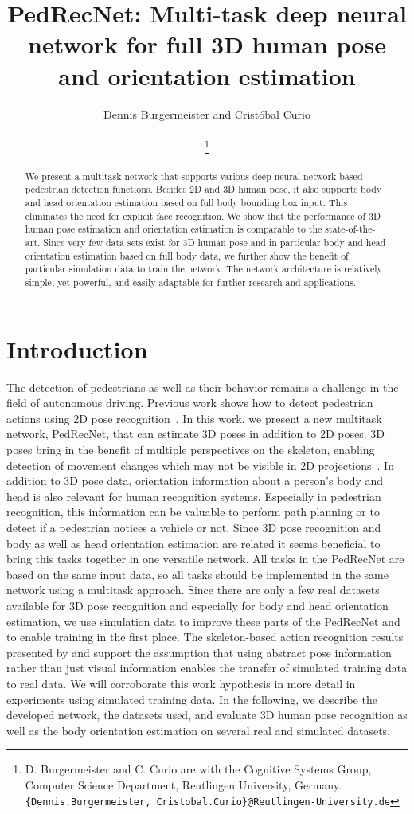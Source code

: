 \documentclass[a4paper, 10pt, conference]{ieeeconf}
\title{\LARGE \bf
PedRecNet: Multi-task deep neural network for full 3D human pose and orientation estimation
}
\author{Dennis Burgermeister and Crist\'obal Curio\\
	\scriptsize \\
\thanks{D. Burgermeister and C. Curio are with the Cognitive Systems Group, Computer Science Department, Reutlingen University, Germany.
{\tt\small \{Dennis.Burgermeister, Cristobal.Curio\}@Reutlingen-University.de}
}}
\begin{document}
\maketitle

\thispagestyle{empty}
\pagestyle{empty}


\begin{abstract}
We present a multitask network that supports various deep neural network based pedestrian detection functions. Besides 2D and 3D human pose, it also supports body and head orientation estimation based on full body bounding box input. This eliminates the need for explicit face recognition. We show that the performance of 3D human pose estimation and orientation estimation is comparable to the state-of-the-art. Since very few data sets exist for 3D human pose and in particular body and head orientation estimation based on full body data, we further show the benefit of particular simulation data to train the network. The network architecture is relatively simple, yet powerful, and easily adaptable for further research and applications.
\end{abstract}

\section{Introduction}
The detection of pedestrians as well as their behavior remains a challenge in the field of autonomous driving. Previous work shows how to detect pedestrian actions using 2D pose recognition~\cite{ludlSimpleEfficientRealtime2019}. In this work, we present a new multitask network, PedRecNet, that can estimate 3D poses in addition to 2D poses. 3D poses bring in the benefit of multiple perspectives on the skeleton, enabling detection of movement changes which may not be visible in 2D projections~\cite{bulthoffTopdownInfluencesStereoscopic1998}. In addition to 3D pose data, orientation information about a person's body and head is also relevant for human recognition systems. Especially in pedestrian recognition, this information can be valuable to perform path planning or to detect if a pedestrian notices a vehicle or not. Since 3D pose recognition and body as well as head orientation estimation are related it seems beneficial to bring this tasks together in one versatile network. All tasks in the PedRecNet are based on the same input data, so all tasks should be implemented in the same network using a multitask approach. Since there are only a few real datasets available for 3D pose recognition and especially for body and head orientation estimation, we use simulation data to improve these parts of the PedRecNet and to enable training in the first place. The skeleton-based action recognition results presented by \cite{ludlSimpleEfficientRealtime2019} and \cite{ludlEnhancingDataDrivenAlgorithms2020} support the assumption that using abstract pose information rather than just visual information enables the transfer of simulated training data to real data. We will corroborate this work hypothesis in more detail in experiments using simulated training data. In the following, we describe the developed network, the datasets used, and evaluate 3D human pose recognition as well as the body orientation estimation on several real and simulated datasets.
\end{document}
